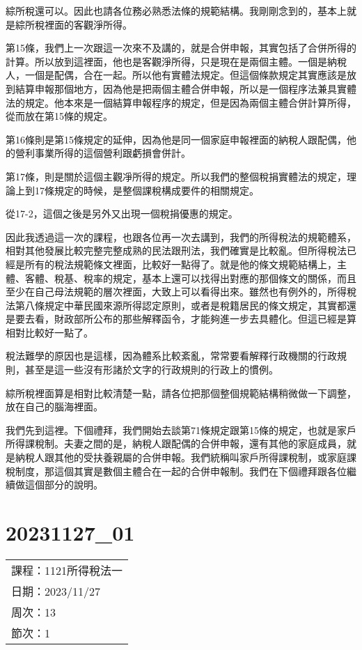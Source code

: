 \documentclass[]{ctexbook}
\begin{document}
綜所稅還可以。因此也請各位務必熟悉法條的規範結構。我剛剛念到的，基本上就是綜所稅裡面的客觀淨所得。

第15條，我們上一次跟這一次來不及講的，就是合併申報，其實包括了合併所得的計算。所以放到這裡面，他也是客觀淨所得，只是現在是兩個主體。一個是納稅人，一個是配偶，合在一起。所以他有實體法規定。但這個條款規定其實應該是放到結算申報那個地方，因為他是把兩個主體合併申報，所以是一個程序法兼具實體法的規定。他本來是一個結算申報程序的規定，但是因為兩個主體合併計算所得，從而放在第15條的規定。

第16條則是第15條規定的延伸，因為他是同一個家庭申報裡面的納稅人跟配偶，他的營利事業所得的這個營利跟虧損會併計。

第17條，則是關於這個主觀凈所得的規定。所以我們的整個稅捐實體法的規定，理論上到17條規定的時候，是整個課稅構成要件的相關規定。

從17-2，這個之後是另外又出現一個稅捐優惠的規定。

因此我透過這一次的課程，也跟各位再一次去講到，我們的所得稅法的規範體系，相對其他發展比較完整完整成熟的民法跟刑法，我們確實是比較亂。但所得稅法已經是所有的稅法規範條文裡面，比較好一點得了。就是他的條文規範結構上，主體、客體、稅基、稅率的規定，基本上還可以找得出對應的那個條文的關係，而且至少在自己母法規範的層次裡面，大致上可以看得出來。雖然也有例外的，所得稅法第八條規定中華民國來源所得認定原則，或者是稅籍居民的條文規定，其實都還是要去看，財政部所公布的那些解釋函令，才能夠進一步去具體化。但這已經是算相對比較好一點了。

稅法難學的原因也是這樣，因為體系比較紊亂，常常要看解釋行政機關的行政規則，甚至是這一些沒有形諸於文字的行政規則的行政上的慣例。

綜所稅裡面算是相對比較清楚一點，請各位把那個整個規範結構稍微做一下調整，放在自己的腦海裡面。

我們先到這裡。下個禮拜，我們開始去談第71條規定跟第15條的規定，也就是家戶所得課稅制。夫妻之間的是，納稅人跟配偶的合併申報，還有其他的家庭成員，就是納稅人跟其他的受扶養親屬的合併申報。我們統稱叫家戶所得課稅制，或家庭課稅制度，那這個其實是數個主體合在一起的合併申報制。我們在下個禮拜跟各位繼續做這個部分的說明。

\hypertarget{section-23}{%
\chapter{20231127\_01}\label{section-23}}

\begin{longtable}[]{@{}l@{}}
\toprule()
\endhead
課程：1121所得稅法一 \\
日期：2023/11/27 \\
周次：13 \\
節次：1 \\
\bottomrule()
\end{longtable}
\end{document}
